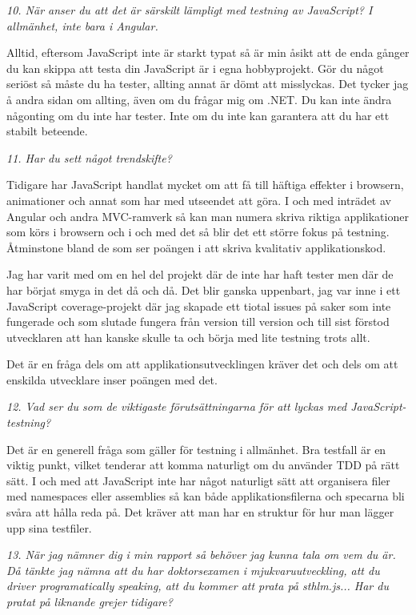 \documentclass[11pt]{article}
\begin{document}
\emph{10. När anser du att det är särskilt lämpligt med testning av JavaScript? I allmänhet, inte bara i Angular.}

Alltid, eftersom JavaScript inte är starkt typat så är min åsikt att de enda gånger du kan skippa att testa din JavaScript är i egna hobbyprojekt. Gör du något seriöst så måste du ha tester, allting annat är dömt att misslyckas. Det tycker jag å andra sidan om allting, även om du frågar mig om .NET. Du kan inte ändra någonting om du inte har tester. Inte om du inte kan garantera att du har ett stabilt beteende.

\emph{11. Har du sett något trendskifte?}

Tidigare har JavaScript handlat mycket om att få till häftiga effekter i browsern, animationer och annat som har med utseendet att göra. I och med inträdet av Angular och andra MVC-ramverk så kan man numera skriva riktiga applikationer som körs i browsern och i och med det så blir det ett större fokus på testning. Åtminstone bland de som ser poängen i att skriva kvalitativ applikationskod.

Jag har varit med om en hel del projekt där de inte har haft tester men där de har börjat smyga in det då och då. Det blir ganska uppenbart, jag var inne i ett JavaScript coverage-projekt där jag skapade ett tiotal issues på saker som inte fungerade och som slutade fungera från version till version och till sist förstod utvecklaren att han kanske skulle ta och börja med lite testning trots allt.

Det är en fråga dels om att applikationsutvecklingen kräver det och dels om att enskilda utvecklare inser poängen med det.

\emph{12. Vad ser du som de viktigaste förutsättningarna för att lyckas med JavaScript-testning?}

Det är en generell fråga som gäller för testning i allmänhet. Bra testfall är en viktig punkt, vilket tenderar att komma naturligt om du använder TDD på rätt sätt. I och med att JavaScript inte har något naturligt sätt att organisera filer med namespaces eller assemblies så kan både applikationsfilerna och specarna bli svåra att hålla reda på. Det kräver att man har en struktur för hur man lägger upp sina testfiler.

\emph{13. När jag nämner dig i min rapport så behöver jag kunna tala om vem du är. Då tänkte jag nämna att du har doktorsexamen i mjukvaruutveckling, att du driver programatically speaking, att du kommer att prata på sthlm.js... Har du pratat på liknande grejer tidigare?}
\end{document}
